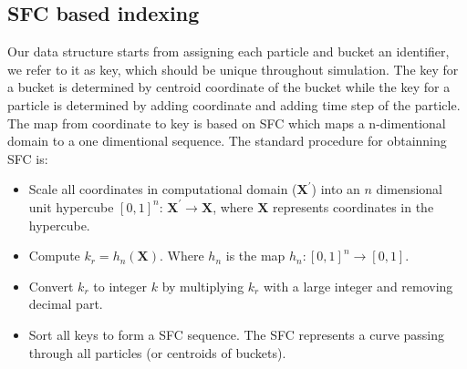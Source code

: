 \documentclass[procedia]{easychair}
\begin{document}
\subsection{SFC based indexing}
Our data structure starts from assigning each particle and bucket an identifier, we refer to it as key, which should be unique throughout simulation. The key for a bucket is determined by centroid coordinate of the bucket while the key for a particle is determined by adding coordinate and adding time step of the particle. The map from coordinate to key is based on SFC \cite{sagan2012space} which maps a n-dimentional domain to a one dimentional sequence. The standard procedure for obtainning SFC is: 
\begin{itemize}
\item Scale all coordinates in computational domain ($\textbf{X}^\prime$) into an $n$ dimensional unit hypercube $[0,1]^n $: $\textbf{X}^\prime \rightarrow \textbf{X}$, where $\textbf{X}$ represents coordinates in the hypercube.
\item Compute $k_r = h_n(\textbf{X})$. Where $h_n$ is the map $h_n: [0,1]^n \rightarrow [0,1]$. 
\item Convert $k_r$ to integer $k$ by multiplying $k_r$ with a large integer and removing decimal part.
\item Sort all keys to form a SFC sequence. The SFC represents a curve passing through all particles (or centroids of buckets).
\end{itemize}
%
\end{document}
